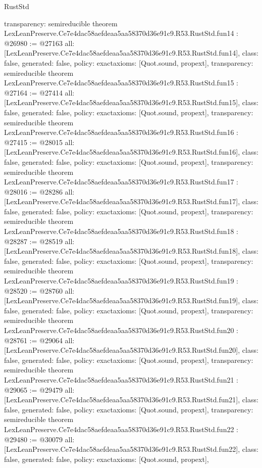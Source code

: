 \begin{lexlean}{RustStd}
\begin{coremodule}
{  transparency: semireducible
}
theorem LexLeanPreserve.Ce7e4dac58aefdeaa5aa58370d36e91c9.R53.RustStd.fun14 : @26980 := @27163 {
  all: [LexLeanPreserve.Ce7e4dac58aefdeaa5aa58370d36e91c9.R53.RustStd.fun14],
  class: false,
  generated: false,
  policy: exact{axioms: [Quot.sound, propext]},
  transparency: semireducible
}
theorem LexLeanPreserve.Ce7e4dac58aefdeaa5aa58370d36e91c9.R53.RustStd.fun15 : @27164 := @27414 {
  all: [LexLeanPreserve.Ce7e4dac58aefdeaa5aa58370d36e91c9.R53.RustStd.fun15],
  class: false,
  generated: false,
  policy: exact{axioms: [Quot.sound, propext]},
  transparency: semireducible
}
theorem LexLeanPreserve.Ce7e4dac58aefdeaa5aa58370d36e91c9.R53.RustStd.fun16 : @27415 := @28015 {
  all: [LexLeanPreserve.Ce7e4dac58aefdeaa5aa58370d36e91c9.R53.RustStd.fun16],
  class: false,
  generated: false,
  policy: exact{axioms: [Quot.sound, propext]},
  transparency: semireducible
}
theorem LexLeanPreserve.Ce7e4dac58aefdeaa5aa58370d36e91c9.R53.RustStd.fun17 : @28016 := @28286 {
  all: [LexLeanPreserve.Ce7e4dac58aefdeaa5aa58370d36e91c9.R53.RustStd.fun17],
  class: false,
  generated: false,
  policy: exact{axioms: [Quot.sound, propext]},
  transparency: semireducible
}
theorem LexLeanPreserve.Ce7e4dac58aefdeaa5aa58370d36e91c9.R53.RustStd.fun18 : @28287 := @28519 {
  all: [LexLeanPreserve.Ce7e4dac58aefdeaa5aa58370d36e91c9.R53.RustStd.fun18],
  class: false,
  generated: false,
  policy: exact{axioms: [Quot.sound, propext]},
  transparency: semireducible
}
theorem LexLeanPreserve.Ce7e4dac58aefdeaa5aa58370d36e91c9.R53.RustStd.fun19 : @28520 := @28760 {
  all: [LexLeanPreserve.Ce7e4dac58aefdeaa5aa58370d36e91c9.R53.RustStd.fun19],
  class: false,
  generated: false,
  policy: exact{axioms: [Quot.sound, propext]},
  transparency: semireducible
}
theorem LexLeanPreserve.Ce7e4dac58aefdeaa5aa58370d36e91c9.R53.RustStd.fun20 : @28761 := @29064 {
  all: [LexLeanPreserve.Ce7e4dac58aefdeaa5aa58370d36e91c9.R53.RustStd.fun20],
  class: false,
  generated: false,
  policy: exact{axioms: [Quot.sound, propext]},
  transparency: semireducible
}
theorem LexLeanPreserve.Ce7e4dac58aefdeaa5aa58370d36e91c9.R53.RustStd.fun21 : @29065 := @29479 {
  all: [LexLeanPreserve.Ce7e4dac58aefdeaa5aa58370d36e91c9.R53.RustStd.fun21],
  class: false,
  generated: false,
  policy: exact{axioms: [Quot.sound, propext]},
  transparency: semireducible
}
theorem LexLeanPreserve.Ce7e4dac58aefdeaa5aa58370d36e91c9.R53.RustStd.fun22 : @29480 := @30079 {
  all: [LexLeanPreserve.Ce7e4dac58aefdeaa5aa58370d36e91c9.R53.RustStd.fun22],
  class: false,
  generated: false,
  policy: exact{axioms: [Quot.sound, propext]},
}
\end{coremodule}
\end{lexlean}
